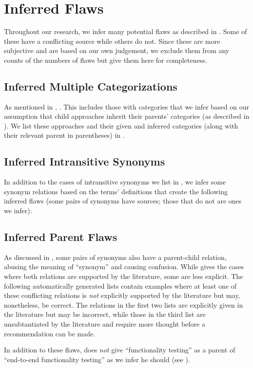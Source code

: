 \section{Inferred Flaws}\label{infer-flaws}
Throughout our research, we infer many potential flaws as described in
. Some of these have a conflicting source while others do not.
Since these are more subjective and are based on our own judgement, we
exclude them from any counts of the numbers of flaws but give them here for
completeness.

\subsection{Inferred Multiple Categorizations}\label{infMultiCats}
As mentioned in , \multiCatIntro{}. This includes those with
categories that we infer based on our assumption that child approaches
inherit their parents' categories (as described in ). We list
these approaches and their given and inferred categories (along with their
relevant parent in parentheses) in .



\newpage

\subsection{Inferred Intransitive Synonyms}\label{infMultiSyns}
In addition to the \multiSynCount{} cases of intransitive synonyms we list in
, we infer some synonym relations based on the terms'
definitions that create the following inferred flaws (some pairs of synonyms
have sources; those that do not are ones we infer):

\begin{enumerate}
    
\end{enumerate}

\subsection{Inferred Parent Flaws}\label{infParSyns}
As discussed in , some pairs of synonyms also have a
parent-child relation, abusing the meaning of ``synonym'' and causing
confusion. While  gives the cases where both relations
are supported by the literature, some are less explicit. The
following automatically generated lists contain examples where at least
one of these conflicting relations is \emph{not} explicitly supported by the
literature but may, nonetheless, be correct. The relations in the first two
lists are explicitly given in the literature but may be incorrect, while
those in the third list are unsubtantiated by the literature and require
more thought before a recommendation can be made.



In addition to these flaws, \citet[Tab.~2]{Gerrard2000a} does
\emph{not} give ``functionality testing'' as a parent of ``end-to-end
functionality testing'' as we infer he should (see ).
